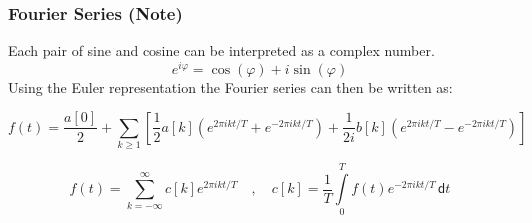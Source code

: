\begin{frame}
    \frametitle{Fourier Series (Note)}
    Each pair of sine and cosine can be interpreted as a complex number.
    \begin{equation*}
        e^{i\varphi} = \cos(\varphi) + i \sin(\varphi)
    \end{equation*}\newline
    Using the Euler representation the Fourier series can then be written as:


    \begin{equation*}
        f(t) = \dfrac {a[0]}{2} + \sum\limits_{k\ge1} \left[ \frac{1}{2} a[k] \left(e^{2\pi ikt/T} + e^{-2\pi ikt/T} \right)+ \frac{1}{2i} b[k] \left(e^{2\pi ikt/T} - e^{-2\pi ikt/T} \right) \right]
    \end{equation*}

    \begin{equation*}
        f(t) = \sum\limits_{k=-\infty}^{\infty} c[k] e^{2\pi ikt/T} \quad , \quad
        c[k] = \frac{1}{T}\int\limits_{0}^{T} f(t) e^{-2\pi ikt/T}\, \mathsf{d}t
    \end{equation*}
\end{frame}



